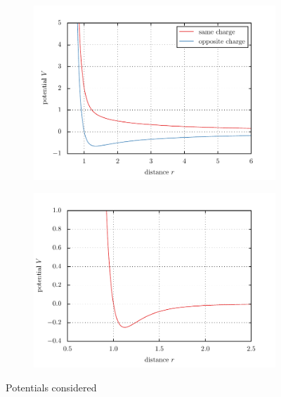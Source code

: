 \documentclass[11pt, a4paper]{article}
\numberwithin{equation}{section}
\begin{document}
\begin{figure}[p]
	\begin{subfigure}{1.0\textwidth}
		\centering
		\includegraphics{./figures/potential_coulomb.pdf}
		\label{fig:coulomb_core}
	\end{subfigure}
	\begin{subfigure}{1.0\textwidth}
		\centering
		\includegraphics{./figures/potential_lennard_jones.pdf}
		\label{fig:lennard_jones}
	\end{subfigure}
	\caption{Potentials considered}	
\end{figure}
\end{document}
